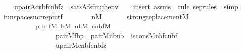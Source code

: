 \begin{isabellebody}
\ \ \ \ upair{\isacharparenleft}{\kern0pt}{\isacharhash}{\kern0pt}{\isacharhash}{\kern0pt}A{\isacharcomma}{\kern0pt}cnbf{\isacharcomma}{\kern0pt}cnbf{\isacharcomma}{\kern0pt}z{\isacharparenright}{\kern0pt}{\isacharparenright}{\kern0pt}\ {\isasymlongleftrightarrow}\ sats{\isacharparenleft}{\kern0pt}A{\isacharcomma}{\kern0pt}{\isacharquery}{\kern0pt}fsfm{\isacharparenleft}{\kern0pt}i{\isacharcomma}{\kern0pt}j{\isacharcomma}{\kern0pt}h{\isacharparenright}{\kern0pt}{\isacharcomma}{\kern0pt}env{\isacharparenright}{\kern0pt}{\isachardoublequoteclose}\isanewline
%
\isadelimproof
\ \ %
\endisadelimproof
%
\isatagproof
{}\isamarkupfalse%
\ {\isacharparenleft}{\kern0pt}insert\ assms\ {\isacharsemicolon}{\kern0pt}\ {\isacharparenleft}{\kern0pt}rule\ sep{\isacharunderscore}{\kern0pt}rules\ {\isacharbar}{\kern0pt}\ simp{\isacharparenright}{\kern0pt}{\isacharplus}{\kern0pt}{\isacharparenright}{\kern0pt}%
\endisatagproof
{\isafoldproof}%
%
\isadelimproof
\isanewline
%
\endisadelimproof
\isanewline
\isanewline
{}\isamarkupfalse%
\ funspace{\isacharunderscore}{\kern0pt}succ{\isacharunderscore}{\kern0pt}rep{\isacharunderscore}{\kern0pt}intf\ {\isacharcolon}{\kern0pt}\isanewline
\ \ \isanewline
\ \ \ \ {\isachardoublequoteopen}n{\isasymin}M{\isachardoublequoteclose}\isanewline
\ \ \isanewline
\ \ \ \ {\isachardoublequoteopen}strong{\isacharunderscore}{\kern0pt}replacement{\isacharparenleft}{\kern0pt}{\isacharhash}{\kern0pt}{\isacharhash}{\kern0pt}M{\isacharcomma}{\kern0pt}\isanewline
\ \ \ \ \ \ \ \ \ \ {\isasymlambda}p\ z{\isachardot}{\kern0pt}\ {\isasymexists}f{\isasymin}M{\isachardot}{\kern0pt}\ {\isasymexists}b{\isasymin}M{\isachardot}{\kern0pt}\ {\isasymexists}nb{\isasymin}M{\isachardot}{\kern0pt}\ {\isasymexists}cnbf{\isasymin}M{\isachardot}{\kern0pt}\isanewline
\ \ \ \ \ \ \ \ \ \ \ \ \ \ \ \ pair{\isacharparenleft}{\kern0pt}{\isacharhash}{\kern0pt}{\isacharhash}{\kern0pt}M{\isacharcomma}{\kern0pt}f{\isacharcomma}{\kern0pt}b{\isacharcomma}{\kern0pt}p{\isacharparenright}{\kern0pt}\ {\isacharampersand}{\kern0pt}\ pair{\isacharparenleft}{\kern0pt}{\isacharhash}{\kern0pt}{\isacharhash}{\kern0pt}M{\isacharcomma}{\kern0pt}n{\isacharcomma}{\kern0pt}b{\isacharcomma}{\kern0pt}nb{\isacharparenright}{\kern0pt}\ {\isacharampersand}{\kern0pt}\ is{\isacharunderscore}{\kern0pt}cons{\isacharparenleft}{\kern0pt}{\isacharhash}{\kern0pt}{\isacharhash}{\kern0pt}M{\isacharcomma}{\kern0pt}nb{\isacharcomma}{\kern0pt}f{\isacharcomma}{\kern0pt}cnbf{\isacharparenright}{\kern0pt}\ {\isacharampersand}{\kern0pt}\isanewline
\ \ \ \ \ \ \ \ \ \ \ \ \ \ \ \ upair{\isacharparenleft}{\kern0pt}{\isacharhash}{\kern0pt}{\isacharhash}{\kern0pt}M{\isacharcomma}{\kern0pt}cnbf{\isacharcomma}{\kern0pt}cnbf{\isacharcomma}{\kern0pt}z{\isacharparenright}{\kern0pt}{\isacharparenright}{\kern0pt}{\isachardoublequoteclose}\isanewline

\end{isabellebody}
